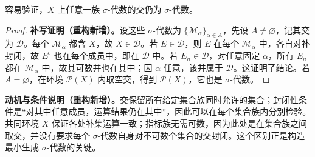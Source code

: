 \documentclass[../../main.tex]{subfiles}%
\begin{document}
\begin{proposition}\label{proposition:ch01-intersection-sigma-algebras}
容易验证，$X$ 上任意一族 $\sigma$-代数的交仍为 $\sigma$-代数。
\end{proposition}
\begin{proof}
\textbf{补写证明（重构新增）。}设这些 $\sigma$-代数为 $\{\mathscr{M}_\alpha\}_{\alpha\in A}$，先设 $A\ne\varnothing$，记其交为 $\mathscr{D}$。每个 $\mathscr{M}_\alpha$ 都含 $X$，故 $X\in\mathscr{D}$。若 $E\in\mathscr{D}$，则 $E$ 在每个 $\mathscr{M}_\alpha$ 中，各自对补封闭，故 $E^{\mathrm c}$ 也在每个成员中，即在 $\mathscr{D}$ 中。若 $E_n\in\mathscr{D}$，对任意固定 $\alpha$，所有 $E_n$ 都在 $\mathscr{M}_\alpha$ 中，故其可数并也在其中；因 $\alpha$ 任意，该并属于 $\mathscr{D}$。这证明了结论。若 $A=\varnothing$，在环境 $\mathscr{P}(X)$ 内取空交，得到 $\mathscr{P}(X)$，它也是 $\sigma$-代数。
\end{proof}
\begin{remark}
\textbf{动机与条件说明（重构新增）。}交保留所有给定集合族同时允许的集合；封闭性条件是“对其中任意成员，运算结果仍在其中”，因此可以在每个集合族内分别检验。共同环境 $X$ 保证各处补集运算一致；指标族无需可数，因为此处是在集合族之间取交，并没有要求每个 $\sigma$-代数自身对不可数个集合的交封闭。这个区别正是构造最小生成 $\sigma$-代数的关键。
\end{remark}
\end{document}

